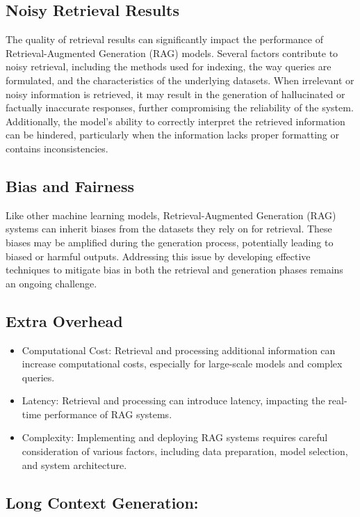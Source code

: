 \subsection{Noisy Retrieval Results}
The quality of retrieval results can significantly impact the performance of Retrieval-Augmented Generation (RAG) models. Several factors contribute to noisy retrieval, including the methods used for indexing, the way queries are formulated, and the characteristics of the underlying datasets. When irrelevant or noisy information is retrieved, it may result in the generation of hallucinated or factually inaccurate responses, further compromising the reliability of the system. Additionally, the model’s ability to correctly interpret the retrieved information can be hindered, particularly when the information lacks proper formatting or contains inconsistencies. 
\subsection{Bias and Fairness} 
Like other machine learning models, Retrieval-Augmented Generation (RAG) systems can inherit biases from the datasets they rely on for retrieval. These biases may be amplified during the generation process, potentially leading to biased or harmful outputs. Addressing this issue by developing effective techniques to mitigate bias in both the retrieval and generation phases remains an ongoing challenge.
\subsection{Extra Overhead}
\begin{itemize}
	\item Computational Cost: Retrieval and processing additional information can increase computational costs, especially for large-scale models and complex queries.
	\item Latency: Retrieval and processing can introduce latency, impacting the real-time performance of RAG systems.
	\item Complexity: Implementing and deploying RAG systems requires careful consideration of various factors, including data preparation, model selection, and system architecture.
\end{itemize}

\subsection{Long Context Generation:}

